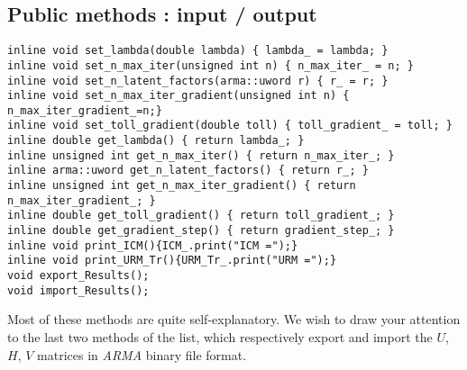 \documentclass[paper=a4, fontsize=12pt]{scrartcl} %
\numberwithin{equation}{section} %
\numberwithin{figure}{section} %
\numberwithin{table}{section} %
\begin{document}
\subsection{Public methods : input / output}
\begin{lstlisting}
inline void set_lambda(double lambda) { lambda_ = lambda; }
inline void set_n_max_iter(unsigned int n) { n_max_iter_ = n; }
inline void set_n_latent_factors(arma::uword r) { r_ = r; }
inline void set_n_max_iter_gradient(unsigned int n) { n_max_iter_gradient_=n;}
inline void set_toll_gradient(double toll) { toll_gradient_ = toll; }
inline double get_lambda() { return lambda_; }
inline unsigned int get_n_max_iter() { return n_max_iter_; }
inline arma::uword get_n_latent_factors() { return r_; }
inline unsigned int get_n_max_iter_gradient() { return n_max_iter_gradient_; }
inline double get_toll_gradient() { return toll_gradient_; }
inline double get_gradient_step() { return gradient_step_; }
inline void print_ICM(){ICM_.print("ICM =");}
inline void print_URM_Tr(){URM_Tr_.print("URM =");}
void export_Results();
void import_Results();
\end{lstlisting}
\vspace{0.5 cm}
Most of these methods are quite self-explanatory. We wish to draw your attention to the last two methods of the list, which respectively export and import the $U$, $H$, $V$ matrices in \emph{ARMA} binary file format.
\end{document}
